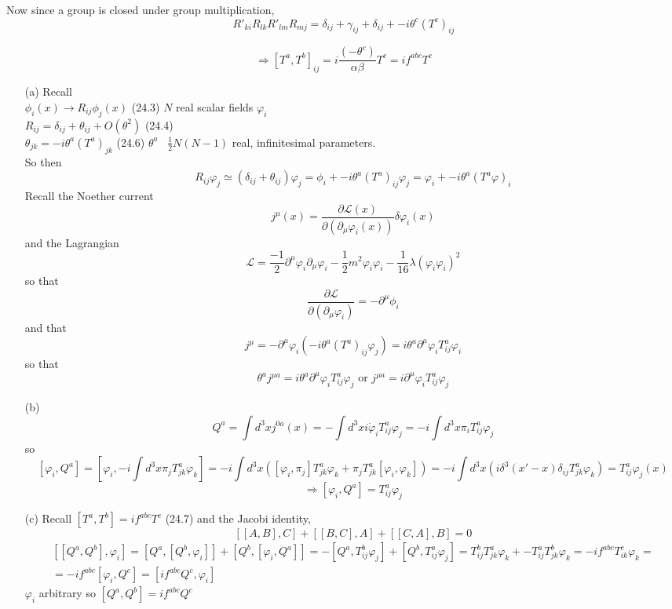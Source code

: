 \documentclass[twoside]{amsart}
\newcommand{\solutionhead}[1]
  {\smallskip
   \noindent{\large\bf Solution #1.}
   }
\begin{document}
Now since a group is closed under group multiplication, 
\[
  R'_{ki} R_{lk} R'_{lm} R_{mj} = \delta_{ij} + \gamma_{ij} + \delta_{ij} + - i \theta^c (T^c)_{ij}
\]

\[
\Longrightarrow \boxed{ [ T^a, T^b]_{ij} = i \frac{ (- \theta^c)}{\alpha \beta} T^c = i f^{abc} T^c }
\]

\solutionhead{24.3}
\begin{enumerate}
\item[(a)] Recall \\
$\phi_i(x) \to R_{ij} \phi_j(x)$ \quad (24.3) $N$ real scalar fields $\varphi_i$ \\
$R_{ij} = \delta_{ij} + \theta_{ij} + O(\theta^2)$ \quad (24.4) \\
$\theta_{jk} = -i \theta^a (T^a)_{jk}$  \quad (24.6) $\theta^a$ \, $\frac{1}{2} N ( N-1)$ real, infinitesimal parameters.   \\

So then 
\[
R_{ij} \varphi_j \simeq (\delta_{ij} + \theta_{ij} ) \varphi_j = \phi_i + -i \theta^a (T^a)_{ij} \varphi_j = \varphi_i + -i \theta^a ( T^a \varphi)_i
\]
Recall the Noether current
\[
j^{\mu}(x) = \frac{ \partial \mathcal{L}(x) }{ \partial ( \partial_{\mu} \varphi_i(x)) } \delta \varphi_i(x)
\]
and the Lagrangian
\[
\mathcal{L} = \frac{-1}{2} \partial^{\mu} \varphi_i \partial_{\mu} \varphi_i - \frac{1}{2} m^2 \varphi_i \varphi_i - \frac{1}{16} \lambda ( \varphi_i \varphi_i)^2
\]
so that 
\[
\frac{ \partial \mathcal{L} }{ \partial ( \partial_{\mu} \varphi_i ) } = - \partial^{\mu} \phi_i 
\]
and that 
\[
j^{\mu} = - \partial^{\mu} \varphi_i ( -i  \theta^a (T^a)_{ij} \varphi_j ) = i \theta^a \partial^{\mu} \varphi_i T^a_{ij} \varphi_i 
\]
so that 
\[
\theta^a j^{\mu a} =i \theta^a \partial^{\mu} \varphi_i T^a_{ij} \varphi_j \text{ or } \boxed{ j^{\mu a} = i \partial^{\mu} \varphi_i T^a_{ij} \varphi_j  }
\]

\item[(b)] \[
Q^a = \int d^3x j^{0 a}(x) = - \int d^3x i \dot{\varphi}_i T_{ij}^a \varphi_j = - i \int d^3x \pi_i T_{ij}^a \varphi_j
\]
so
\[
[\varphi_i, Q^a ] = [ \varphi_i, -i \int d^3x \pi_j T^a_{jk} \varphi_k ] = -i \int d^3x \left( [ \varphi_i, \pi_j ] T_{jk}^a \varphi_k + \pi_j T^a_{jk} [ \varphi_i, \varphi_k ] \right) = -i \int d^3x \left( i \delta^3(x'-x) \delta_{ij} T_{jk}^a \varphi_k \right) = T_{ij}^a \varphi_j(x)
\]
\[
\Longrightarrow \boxed{ [\varphi_i, Q^a] = T^a_{ij}\varphi_j }
\]
\item[(c)] Recall $[T^a, T^b] = i f^{abc} T^c$  \quad (24.7)  and the Jacobi identity,
\[
[[A,B],C ] + [[B,C] ,A] + [[C,A] ,B] = 0 
\]
\[
\begin{gathered}
  [[Q^a, Q^b], \varphi_i ] = [ Q^a, [Q^b, \varphi_i ]] + [ Q^b , [\varphi_i, Q^a]] = - [ Q^a , T^b_{ij} \varphi_j ] + [Q^b , T^a_{ij} \varphi_j ] = T^b_{ij} T^a_{jk} \varphi_k + - T_{ij}^a T^b_{jk} \varphi_k = -i f^{abc} T^c_{ik} \varphi_k = \\
  = -i f^{abc}  [ \varphi_i, Q^c] = [if^{abc} Q^c, \varphi_i ]
\end{gathered}
\]
$\varphi_i$ arbitrary so $[Q^a, Q^b] = i f^{abc} Q^c$
\end{enumerate}
\end{document}
